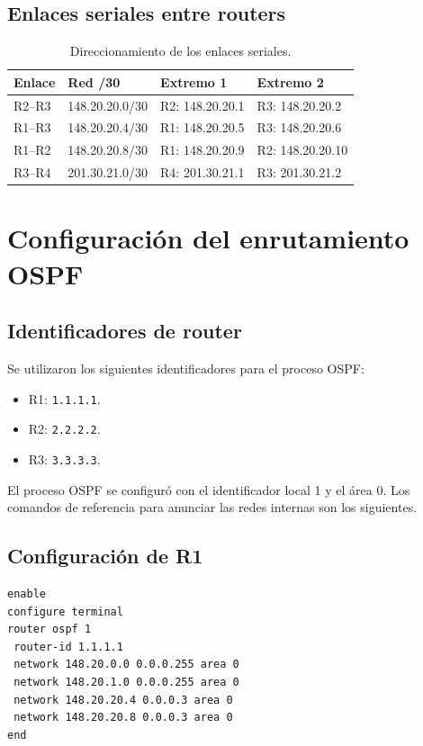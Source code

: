 \documentclass[12pt,a4paper]{article}
\begin{document}
\subsection{Enlaces seriales entre routers}

\begin{table}[H]
\centering
\small
\begin{tabular}{|l|l|l|l|}
\hline
\textbf{Enlace} & \textbf{Red /30} & \textbf{Extremo 1} & \textbf{Extremo 2} \\
\hline
R2--R3 & 148.20.20.0/30 & R2: 148.20.20.1 & R3: 148.20.20.2 \\
\hline
R1--R3 & 148.20.20.4/30 & R1: 148.20.20.5 & R3: 148.20.20.6 \\
\hline
R1--R2 & 148.20.20.8/30 & R1: 148.20.20.9 & R2: 148.20.20.10 \\
\hline
R3--R4 & 201.30.21.0/30 & R4: 201.30.21.1 & R3: 201.30.21.2 \\
\hline
\end{tabular}
\caption{Direccionamiento de los enlaces seriales.}
\end{table}

\section{Configuración del enrutamiento OSPF}

\subsection{Identificadores de router}

Se utilizaron los siguientes identificadores para el proceso OSPF:

\begin{itemize}
    \item R1: \texttt{1.1.1.1}.
    \item R2: \texttt{2.2.2.2}.
    \item R3: \texttt{3.3.3.3}.
\end{itemize}

El proceso OSPF se configuró con el identificador local 1 y el
área 0. Los comandos de referencia para anunciar las redes internas
son los siguientes.

\subsection{Configuración de R1}

\begin{lstlisting}
enable
configure terminal
router ospf 1
 router-id 1.1.1.1
 network 148.20.0.0 0.0.0.255 area 0
 network 148.20.1.0 0.0.0.255 area 0
 network 148.20.20.4 0.0.0.3 area 0
 network 148.20.20.8 0.0.0.3 area 0
end
\end{lstlisting}
\end{document}
